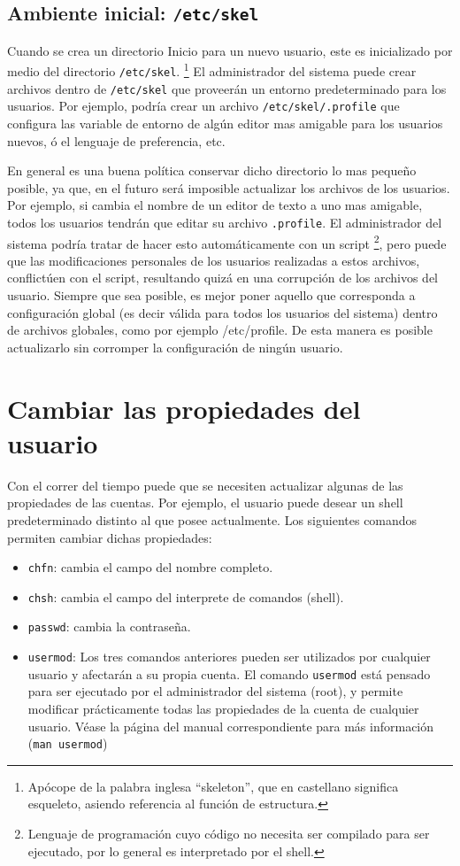 \documentclass[12pt]{article}
\begin{document}
\subsection*{Ambiente inicial: \texttt{/etc/skel}}

Cuando se crea un directorio Inicio para un nuevo usuario, este es
inicializado por medio del directorio \texttt{/etc/skel}. 
\footnote{Apócope de la palabra inglesa ``skeleton'', que en castellano 
significa esqueleto, asiendo referencia al función de estructura.} El
administrador del sistema puede crear archivos dentro de
\texttt{/etc/skel} que proveerán un entorno predeterminado
para los usuarios. Por ejemplo, podría crear un archivo 
\texttt{/etc/skel/.profile} que configura las variable de entorno
de algún editor mas amigable para los usuarios nuevos, ó el lenguaje 
de preferencia, etc. 


En general es una buena política conservar dicho directorio lo mas pequeño
posible, ya que, en el futuro será imposible actualizar los archivos de
los usuarios. Por ejemplo, si cambia el nombre de un editor de texto a uno mas amigable,
todos los usuarios tendrán que editar su archivo  \texttt{.profile}.
El administrador del sistema podría tratar de hacer esto automáticamente con un
script \footnote{Lenguaje de programación cuyo código no necesita ser
compilado para ser ejecutado, por lo general es interpretado por el shell.}, pero
puede que las modificaciones personales de los usuarios realizadas a estos 
archivos, conflictúen con el script, resultando quizá en una corrupción de 
los archivos del usuario. Siempre que sea posible, es mejor poner aquello que 
corresponda a configuración global (es decir válida para todos los usuarios del sistema)
dentro de archivos globales, como por ejemplo /etc/profile. De esta manera es posible
actualizarlo sin corromper la configuración de ningún usuario.  


\section*{Cambiar las propiedades del usuario}
Con el correr del tiempo puede que se necesiten actualizar algunas de las 
propiedades de las cuentas. Por ejemplo, el usuario puede desear un shell 
predeterminado distinto al que posee actualmente. Los siguientes comandos 
permiten cambiar dichas propiedades: 

\begin{itemize}
\item 	\texttt{chfn}:  cambia el campo del nombre completo.
\item 	\texttt{chsh}:  cambia el campo del interprete de comandos (shell).
\item 	\texttt{passwd}: cambia la contraseña. 
\item 	\texttt{usermod}: Los tres comandos anteriores pueden ser utilizados 
por cualquier usuario y afectarán a su propia cuenta. El comando \texttt{usermod}
está pensado para ser ejecutado por el administrador del sistema (root), y 
permite modificar prácticamente todas las propiedades de la cuenta de cualquier 
usuario. Véase la página del manual correspondiente para más información
(\texttt{man usermod})
\end{itemize}
\end{document}
